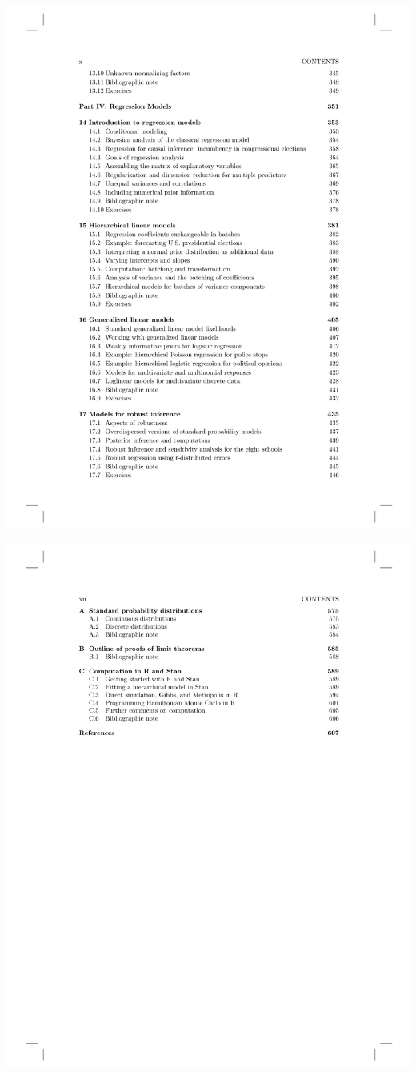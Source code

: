 \documentclass[18pt]{beamer}
\begin{document}
\begin{frame}
{\vspace*{-.8\baselineskip}
\scalebox{.5}{$\vdots$}
\vspace*{-.2\baselineskip}

\includegraphics[width=.7\linewidth]{Figure/bda_toc_middle_2}

\vspace*{-.8\baselineskip}
\scalebox{.5}{$\vdots$}
\vspace*{-.2\baselineskip}

\includegraphics[width=.7\linewidth]{Figure/bda_toc_foot}

}

\end{frame}
\end{document}
